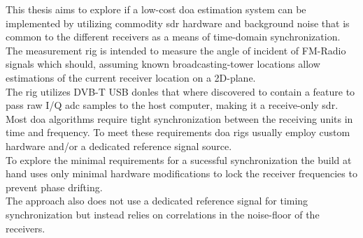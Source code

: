 This thesis aims to explore if a low-cost \gls{doa} estimation
system can be implemented by utilizing commodity \gls{sdr} hardware
and background noise that is common to the different receivers as
a means of time-domain synchronization. \\

The measurement rig is intended to measure the angle of incident
of FM-Radio signals which should, assuming known broadcasting-tower
locations allow estimations of the current receiver location on
a 2D-plane. \\

The rig utilizes DVB-T USB donles that where discovered \cite{rtlhistory}
to contain a feature to pass raw I/Q \acrshort{adc} samples
to the host computer, making it a receive-only \gls{sdr}. \\

Most \gls{doa} algorithms require tight synchronization between
the receiving units in time and frequency. To meet these requirements
\gls{doa} rigs usually employ custom hardware and/or a dedicated
reference signal source. \\

To explore the minimal requirements for a sucessful synchronization
the build at hand uses only minimal hardware modifications
to lock the receiver frequencies to prevent phase drifting. \\

The approach also does not use a dedicated reference signal
for timing synchronization but instead relies on correlations
in the noise-floor of the receivers.
